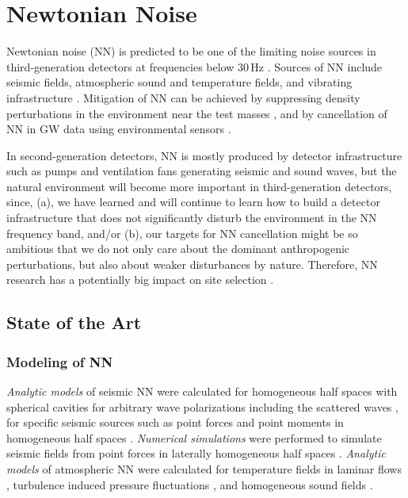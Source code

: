 \chapter{Newtonian Noise}
\label{sec:Newtonian_Noise}

Newtonian noise (NN) is predicted to be one of the limiting noise sources in third-generation detectors at frequencies below 30\,Hz \cite{Saulson:NN,Har2015}. Sources of NN include seismic fields, atmospheric sound and temperature fields, and vibrating infrastructure \cite{HuTh1998,BeEA1998,Cre2008,FiEA2018,Har2015}. Mitigation of NN can be achieved by suppressing density perturbations in the environment near the test masses \cite{HaHi2014}, and by cancellation of NN in GW data using environmental sensors \cite{Cel2000,CoEA2016a}.

In second-generation detectors, NN is mostly produced by detector infrastructure such as pumps and ventilation fans generating seismic and sound waves, but the natural environment will become more important in third-generation detectors, since, (a), we have learned and will continue to learn how to build a detector infrastructure that does not significantly disturb the environment in the NN frequency band, and/or (b), our targets for NN cancellation might be so ambitious that we do not only care about the dominant anthropogenic perturbations, but also about weaker disturbances by nature. Therefore, NN research has a potentially big impact on site selection \cite{BeEA2010}. 

\section{State of the Art}
\subsection{Modeling of NN} \emph{Analytic models} of seismic NN were calculated for homogeneous half spaces with spherical cavities for arbitrary wave polarizations including the scattered waves \cite{Har2015}, for specific seismic sources such as point forces and point moments in homogeneous half spaces \cite{HaEA2015,Har2016}. \emph{Numerical simulations} were performed to simulate seismic fields from point forces in laterally homogeneous half spaces \cite{BeEA2010c}. \emph{Analytic models} of atmospheric NN were calculated for temperature fields in laminar flows \cite{Cre2008}, turbulence induced pressure fluctuations \cite{Har2015}, and homogeneous sound fields \cite{FiEA2018}. 

